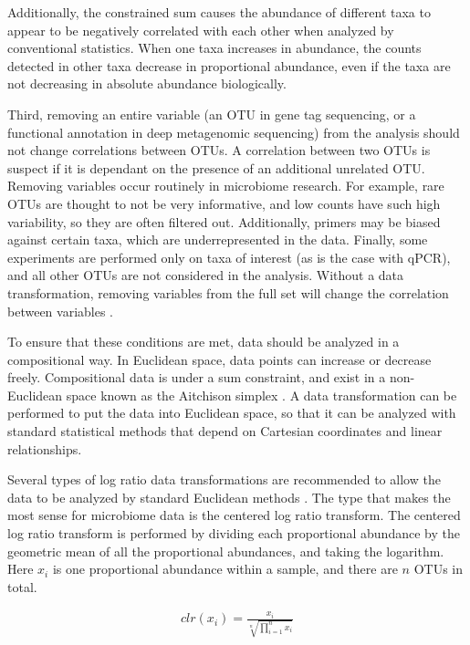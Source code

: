 Additionally, the constrained sum causes the abundance of different taxa to appear to be negatively correlated with each other when analyzed by conventional statistics. When one taxa increases in abundance, the counts detected in other taxa decrease in proportional abundance, even if the taxa are not decreasing in absolute abundance biologically.

Third, removing an entire variable (an OTU in gene tag sequencing, or a functional annotation in deep metagenomic sequencing) from the analysis should not change correlations between OTUs. A correlation between two OTUs is suspect if it is dependant on the presence of an additional unrelated OTU. Removing variables occur routinely in microbiome research. For example, rare OTUs are thought to not be very informative, and low counts have such high variability, so they are often filtered out. Additionally, primers may be biased against certain taxa, which are underrepresented in the data. Finally, some experiments are performed only on taxa of interest (as is the case with qPCR), and all other OTUs are not considered in the analysis. Without a data transformation, removing variables from the full set will change the correlation between variables \cite{aitchison1982statistical}.

To ensure that these conditions are met, data should be analyzed in a compositional way. In Euclidean space, data points can increase or decrease freely. Compositional data is under a sum constraint, and exist in a non-Euclidean space known as the Aitchison simplex \cite{aitchison1982statistical}. A data transformation can be performed to put the data into Euclidean space, so that it can be analyzed with standard statistical methods that depend on Cartesian coordinates and linear relationships.

Several types of log ratio data transformations are recommended to allow the data to be analyzed by standard Euclidean methods \cite{aitchison1982statistical}. The type that makes the most sense for microbiome data is the centered log ratio transform. The centered log ratio transform is performed by dividing each proportional abundance by the geometric mean of all the proportional abundances, and taking the logarithm. Here $x_i$ is one proportional abundance within a sample, and there are $n$ OTUs in total.

\begin{align*}
clr(x_i) = \frac{x_i}{\sqrt[n]{\prod_{i=1}^{n} x_i}}
\end{align*}


